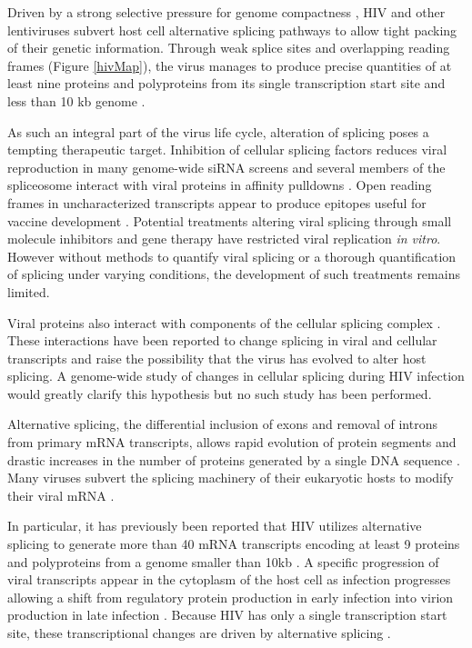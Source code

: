 \documentclass[../sherrill-Mix_thesis.tex]{subfiles}
\begin{document}
	Driven by a strong selective pressure for genome compactness \citep{Gelinas1986,Herman1987,Shin2000}, HIV and other lentiviruses subvert host cell alternative splicing pathways to allow tight packing of their genetic information. Through weak splice sites and overlapping reading frames (Figure \ref{hivMap}), the virus manages to produce precise quantities of at least nine proteins and polyproteins from its single transcription start site and less than 10 kb genome \citep{Stoltzfus2009}. 

	As such an integral part of the virus life cycle\citep{Kim1989,Pomerantz1990}, alteration of splicing poses a tempting therapeutic target. Inhibition of cellular splicing factors reduces viral reproduction in many genome-wide siRNA screens \citep{Brass2008,Konig2008,Bushman2009} and several members of the spliceosome interact with viral proteins in affinity pulldowns \citep{Jager2012}. Open reading frames in uncharacterized transcripts appear to produce epitopes useful for vaccine development \citep{Bansal2010}. Potential treatments altering viral splicing through small molecule inhibitors \citep{Fukuhara2006,Bakkour2007} and gene therapy \citep{Asparuhova2007,Mandal2010} have restricted viral replication \emph{in vitro}. However without methods to quantify viral splicing or a thorough quantification of splicing under varying conditions, the development of such treatments remains limited. 

	Viral proteins also interact with components of the cellular splicing complex \citep{Tange1996,Berro2006,Jager2012}. These interactions have been reported to change splicing in viral\citep{Berro2006,Bohne2007,Jablonski2010} and cellular transcripts \citep{Kuramitsu2005,Hashizume2007} and raise the possibility that the virus has evolved to alter host splicing. A genome-wide study of changes in cellular splicing during HIV infection would greatly clarify this hypothesis but no such study has been performed. 

	Alternative splicing, the differential inclusion of exons and removal of introns from primary mRNA transcripts, allows rapid evolution of protein segments \citep{Kopelman2005,Xing2005,Su2006} and drastic increases in the number of proteins generated by a single DNA sequence \citep{Watson2005}. Many viruses subvert the splicing machinery of their eukaryotic hosts to modify their viral mRNA \citep{Pollard1998}. 

	In particular, it has previously been reported that HIV utilizes alternative splicing to generate more than 40 mRNA transcripts encoding at least 9 proteins and polyproteins from a genome smaller than 10kb \citep{Purcell1993}. A specific progression of viral transcripts appear in the cytoplasm of the host cell as infection progresses allowing a shift from regulatory protein production in early infection into virion production in late infection \citep{Kim1989,Pomerantz1990,Klotman1991}. Because HIV has only a single transcription start site, these transcriptional changes are driven by alternative splicing \citep{Stoltzfus2009}. 
\end{document}
